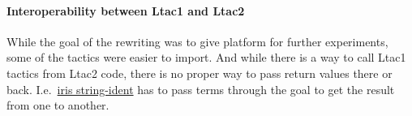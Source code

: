 \paragraph{Interoperability between Ltac1 and Ltac2}

While the goal of the rewriting was to give platform for further experiments, some of the tactics were easier to import.
And while there is a way to call Ltac1 tactics from Ltac2 code, there is no proper way to pass return values there or back.
I.e.\ \href{https://gitlab.mpi-sws.org/iris/string-ident/}{iris string-ident} has to pass terms through the goal to get the result from one to another.

